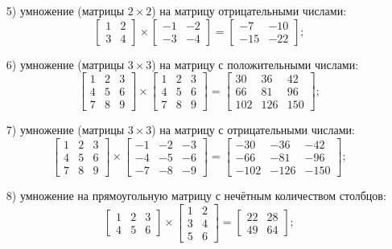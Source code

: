 \documentclass[a4paper,12pt]{article}
\begin{document}
\begin{enumerate}
		\item[5)] умножение (матрицы $2 \times 2$) на матрицу отрицательными числами:
\[ \begin{bmatrix}
1 & 2 \\
3 & 4
\end{bmatrix} \times 
\begin{bmatrix}
-1 & -2 \\
-3 & -4
\end{bmatrix} =
\begin{bmatrix}
-7 & -10 \\
-15 & -22
\end{bmatrix}; \]


		\item[6)] умножение (матрицы $3 \times 3$) на матрицу с положительными числами:
\[ \begin{bmatrix}
1 & 2 & 3 \\
4 & 5 & 6 \\
7 & 8 & 9 
\end{bmatrix} \times 
\begin{bmatrix}
1 & 2 & 3 \\
4 & 5 & 6 \\
7 & 8 & 9 
\end{bmatrix} =
\begin{bmatrix}
30 & 36 & 42 \\
66 & 81 & 96 \\
102 & 126 & 150 
\end{bmatrix}; \]

		\item[7)] умножение (матрицы $3 \times 3$) на матрицу с отрицательными числами:
\[ \begin{bmatrix}
1 & 2 & 3 \\
4 & 5 & 6 \\
7 & 8 & 9 
\end{bmatrix} \times 
\begin{bmatrix}
-1 & -2 & -3 \\
-4 & -5 & -6 \\
-7 & -8 & -9 
\end{bmatrix} =
\begin{bmatrix}
-30 & -36 & -42 \\
-66 & -81 & -96 \\
-102 & -126 & -150 
\end{bmatrix}; \]

	\item[8)] умножение на прямоугольную матрицу с нечётным количеством столбцов:
\[ \begin{bmatrix}
1 & 2 & 3\\
4 & 5 & 6
\end{bmatrix} \times 
\begin{bmatrix}
1 & 2 \\
3 & 4 \\
5 & 6
\end{bmatrix} =
\begin{bmatrix}
22 & 28 \\
49 & 64
\end{bmatrix}; \]


\end{enumerate}
\end{document}
